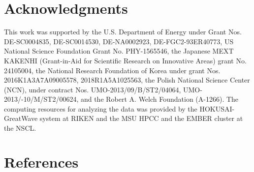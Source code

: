 \documentclass[review,number,sort&compress]{elsarticle}
\begin{document}
\section{Acknowledgments}
This work was supported by the U.S. Department of Energy under Grant Nos.  DE-SC0004835,  DE-SC0014530, DE-NA0002923, DE-FGC2-93ER40773,  US  National Science Foundation Grant  No.  PHY-1565546, the  Japanese  MEXT  KAKENHI (Grant-in-Aid  for  Scientific  Research  on  Innovative  Areas)  grant  No. 24105004, the National Research Foundation of Korea under grant Nos. 2016K1A3A7A09005578, 2018R1A5A1025563,  the Polish National Science Center (NCN), under contract Nos. UMO-2013/09/B/ST2/04064, UMO-2013/-10/M/ST2/00624, and the Robert A. Welch Foundation (A-1266). The computing resources for analyzing the data was provided by the HOKUSAI-GreatWave system at RIKEN and the MSU HPCC and the EMBER cluster at the NSCL. 

\section*{References}


\end{document}
